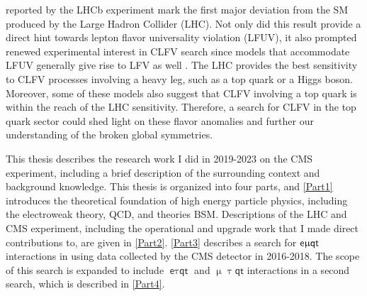 reported by the LHCb experiment mark the first major deviation from the SM produced by the Large Hadron Collider (LHC). Not only did this result provide a direct hint towards lepton flavor universality violation (LFUV), it also prompted renewed experimental interest in CLFV search since models that accommodate LFUV generally give rise to LFV as well \cite{Glashow:2014iga}. The LHC provides the best sensitivity to CLFV processes involving a heavy leg, such as a top quark or a Higgs boson. Moreover, some of these models \cite{Kim:2018oih} also suggest that CLFV involving a top quark is within the reach of the LHC sensitivity. Therefore, a search for CLFV in the top quark sector could shed light on these flavor anomalies and further our understanding of the broken global symmetries.

This thesis describes the research work I did in 2019-2023 on the \ac{CMS} experiment, including a brief description of the surrounding context and background knowledge. This thesis is organized into four parts, and \autoref{Part1} introduces the theoretical foundation of high energy particle physics, including the electroweak theory, \ac{QCD}, and theories \ac{BSM}. Descriptions of the \ac{LHC} and {CMS} experiment, including the operational and upgrade work that I made direct contributions to, are given in \autoref{Part2}. \autoref{Part3} describes a search for $\textsf{e}\upmu\textsf{{q}t}$ interactions in using data collected by the \ac{CMS} detector in 2016-2018. The scope of this search is expanded to include $\textsf{e}\uptau\textsf{qt}$ and $\upmu\uptau\textsf{qt}$ interactions in a second search, which is described in \autoref{Part4}.




